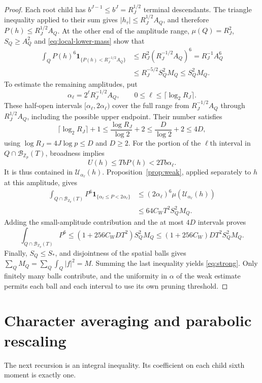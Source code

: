 \documentclass[11pt,twoside,a4paper]{article}
\numberwithin{equation}{section}
\theoremstyle{definition}
\newcommand{\Z}{\mathbb Z_p}
\newcommand{\one}{\mathbf 1}
\newcommand{\cB}{\mathcal B}
\begin{document}
\begin{proof}
Each root child has $b^{J-1}\le b^J=R_J^{1/2}$ terminal descendants. The triangle inequality applied to their sum gives $|h_\tau|\le R_J^{1/2}A_Q$, and therefore $P(h)\le R_J^{1/2}A_Q$. At the other end of the amplitude range, $\mu(Q)=R_J^2$, $S_Q\ge A_Q^2$ and \eqref{eq:local-lower-mass} show that
$$
\begin{aligned}
\int_QP(h)^6\one_{\{P(h)<R_J^{-1/2}A_Q\}}
&\le R_J^2(R_J^{-1/2}A_Q)^6=R_J^{-1}A_Q^6\\
&\le R_J^{-5/2}S_Q^2M_Q\le S_Q^2M_Q.
\end{aligned}
$$
To estimate the remaining amplitudes, put
$$
\alpha_\ell=2^\ell R_J^{-1/2}A_Q,
\qquad 0\le\ell\le\lceil\log_2R_J\rceil.
$$
These half-open intervals $[\alpha_\ell,2\alpha_\ell)$ cover the full range from $R_J^{-1/2}A_Q$ through $R_J^{1/2}A_Q$, including the possible upper endpoint. Their number satisfies
$$
\lceil\log_2R_J\rceil+1
\le\frac{\log R_J}{\log2}+2
\le\frac D{\log2}+2\le4D,
$$
using $\log R_J=4J\log p\le D$ and $D\ge2$. For the portion of the $\ell$th interval in $Q\cap\cB_{\Z}(T)$, broadness implies
$$
U(h)\le TbP(h)<2Tb\alpha_\ell.
$$
It is thus contained in $\mathcal U_{\alpha_\ell}(h)$. Proposition~\ref{prop:weak}, applied separately to $h$ at this amplitude, gives
$$
\begin{aligned}
\int_{Q\cap\cB_{\Z}(T)}P^6\one_{\{\alpha_\ell\le P<2\alpha_\ell\}}
&\le(2\alpha_\ell)^6\mu(\mathcal U_{\alpha_\ell}(h))\\
&\le64C_WT^2S_Q^2M_Q.
\end{aligned}
$$
Adding the small-amplitude contribution and the at most $4D$ intervals proves
$$
\int_{Q\cap\cB_{\Z}(T)}P^6
\le(1+256C_WDT^2)S_Q^2M_Q
\le(1+256C_W)DT^2S_Q^2M_Q.
$$
Finally, $S_Q\le S_*$, and disjointness of the spatial balls gives $\sum_QM_Q=\sum_Q\int_Q|f|^2=M$. Summing the last inequality yields \eqref{eq:strong}. Only finitely many balls contribute, and the uniformity in $\alpha$ of the weak estimate permits each ball and each interval to use its own pruning threshold.
\end{proof}
\section{Character averaging and parabolic rescaling}\label{sec:recursion}
The next recursion is an integral inequality. Its coefficient on each child sixth moment is exactly one.
\end{document}
